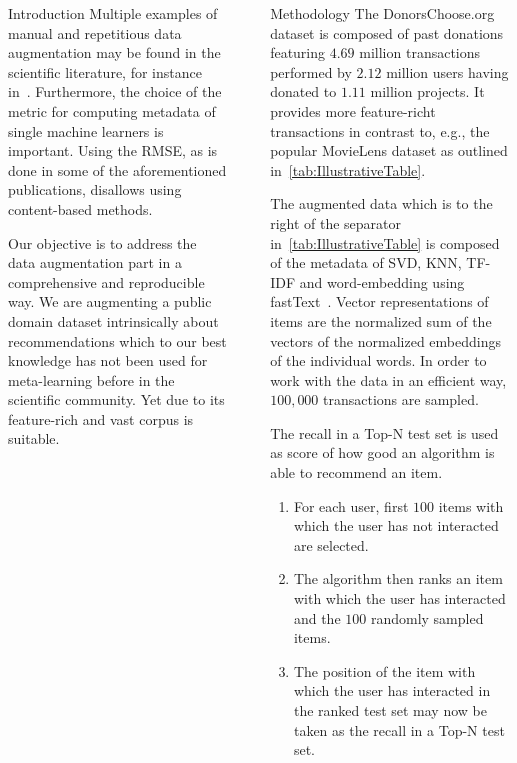 \documentclass[final]{beamer}
\newcommand{\parvspace}[1]{\vspace{.5em}}  %
\begin{document}
\begin{frame}[t,fragile=singleslide]{}
\begin{columns}[t]
\begin{column}{0.45\textwidth}
\begin{block}{Introduction}
				Multiple examples of manual and repetitious data augmentation may be found in the scientific literature, for instance in~\cite{CUNHA2018128,DBLP:journals/corr/abs-1805-12118,Ekstrand:2012:RFP:2365952.2366002}. Furthermore, the choice of the metric for computing metadata of single machine learners is important. Using the RMSE, as is done in some of the aforementioned publications, disallows using content-based methods.
				\parvspace{}

				Our objective is to address the data augmentation part in a comprehensive and reproducible way. We are augmenting a public domain dataset intrinsically about recommendations which to our best knowledge has not been used for meta-learning before in the scientific community. Yet due to its feature-rich and vast corpus is suitable.
			\end{block}
		\end{column}

		{
			\color{gray}
			\hspace{-1em}
			\vrule{}
			\hspace{+1em}
		}

		\begin{column}{0.45\textwidth}
			\begin{block}{Methodology}
				The DonorsChoose.org dataset is composed of past donations featuring $4.69$ million transactions performed by $2.12$ million users having donated to $1.11$ million projects. It provides more feature-richt transactions in contrast to, e.g., the popular MovieLens dataset as outlined in~\autoref{tab:IllustrativeTable}.
				\parvspace{}

				The augmented data which is to the right of the separator in~\autoref{tab:IllustrativeTable} is composed of the metadata of SVD, KNN, TF-IDF and word-embedding using fastText~\cite{scikit-learn,rehurek_lrec,DBLP:journals/corr/BojanowskiGJM16}. Vector representations of items are the normalized sum of the vectors of the normalized embeddings of the individual words. In order to work with the data in an efficient way, $100,000$ transactions are sampled.
				\parvspace{}

				The recall in a Top-N test set is used as score of how good an algorithm is able to recommend an item.
				\begin{enumerate}
					\item For each user, first $100$ items with which the user has not interacted are selected.
					\item The algorithm then ranks an item with which the user has interacted and the $100$ randomly sampled items.
					\item The position of the item with which the user has interacted in the ranked test set may now be taken as the recall in a Top-N test set.
				\end{enumerate}
			\end{block}
		\end{column}
	\end{columns}


\end{frame}
\end{document}
